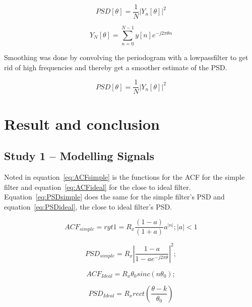 \documentclass[10pt]{article}
\begin{document}
\begin{equation}
\label{eq:Peri}
PSD[\theta] = \frac{1}{N}|Y_n[\theta]|^2
\end{equation}

\begin{equation}
\label{eq:YN}
Y_N[\theta] = \sum_{n=0}^{N-1}y[n]e^{-j2\pi\theta n}
\end{equation}

Smoothing was done by convolving the periodogram with a lowpassfilter to get rid of high frequencies and thereby get a smoother estimate of the PSD.

\begin{equation}
\label{eq:Smooth}
PSD[\theta] = \frac{1}{N}|Y_n[\theta]|^2
\end{equation}


\section{Result and conclusion}
\subsection{Study 1 – Modelling Signals}

Noted in equation~\ref{eq:ACFsimple} is the functions for the ACF
for the simple filter and equation~\ref{eq:ACFideal} for the close to ideal filter.
Equation~\ref{eq:PSDsimple} does the same for the simple filter's PSD
and equation~\ref{eq:PSDideal}, the close to ideal filter's PSD.

\begin{equation}
  \label{eq:ACFsimple}
  ACF_{simple} = ryt1 = R_x\frac{(1-a)}{(1+a)}a^{|n|};  |a| < 1
\end{equation}

\begin{equation}
  \label{eq:PSDsimple}
  PSD_{simple} =  R_x|\frac{1-a}{1-ae^{-j2\pi\theta}}|^2;
\end{equation}

\begin{equation}
  \label{eq:ACFideal}
  ACF_{Ideal} = R_x\theta_{0}sinc(n\theta_0);
\end{equation}

\begin{equation}
  \label{eq:PSDideal}
  PSD_{Ideal} = R_xrect(\frac{\theta - k}{\theta_0})
\end{equation}
\clearpage
\end{document}
